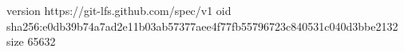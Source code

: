version https://git-lfs.github.com/spec/v1
oid sha256:e0db39b74a7ad2e11b03ab57377aee4f77fb55796723c840531c040d3bbe2132
size 65632
